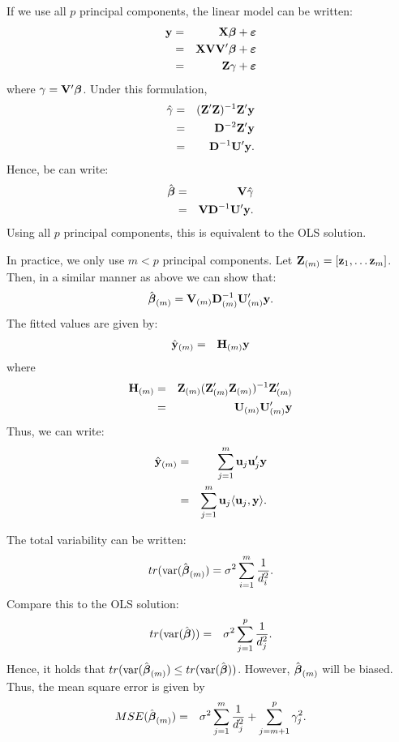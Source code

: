 If we use all $p$ principal components, the linear model can be written:
\begin{eqnarray*}
\mathbf{y} &=& \mathbf{X} \mbox{\boldmath $\beta$} + \mbox{\boldmath $\varepsilon$} \\
&=& \mathbf{X} \mathbf{V} \mathbf{V}' \mbox{\boldmath $\beta$} + \mbox{\boldmath $\varepsilon$} \\
&=& \mathbf{Z} {\bf \gamma} + \mbox{\boldmath $\varepsilon$}
\end{eqnarray*}
where ${\bf \gamma} = \mathbf{V}' \mbox{\boldmath $\beta$}$.
Under this formulation,
\begin{eqnarray*}
\hat {\bf \gamma} &=& (\mathbf{Z}' \mathbf{Z})^{-1} \mathbf{Z}' \mathbf{y} \\
&=& \mathbf{D}^{-2} \mathbf{Z}' \mathbf{y}\\
&=& \mathbf{D}^{-1} \mathbf{U}' \mathbf{y}.
\end{eqnarray*}
Hence, be can write:
\begin{eqnarray*}
\hat {\mbox{\boldmath $\beta$}} &=& \mathbf{V} \hat {\bf \gamma}  \\
&=& \mathbf{V} \mathbf{D}^{-1} \mathbf{U}' \mathbf{y}.
\end{eqnarray*}
Using all $p$ principal components, this is equivalent to the OLS solution.

In practice, we only use $m < p$ principal components.
Let $\mathbf{Z}_{(m)} = [\mathbf{z}_1, \ldots \mathbf{z}_m]$.
Then, in a similar manner as above we can show that:
$$\hat {\mbox{\boldmath $\beta$}}_{(m)} = \mathbf{V}_{(m)} \mathbf{D}_{(m)}^{-1} \mathbf{U}_{(m)}' \mathbf{y}.$$
The fitted values are given by: 
\begin{eqnarray*}
\hat {\mathbf{y}}_{(m)} &=& \mathbf{H}_{(m)} \mathbf{y}
\end{eqnarray*}
where
\begin{eqnarray*}
\mathbf{H}_{(m)} &=& \mathbf{Z}_{(m)} (\mathbf{Z}_{(m)}'\mathbf{Z}_{(m)})^{-1} \mathbf{Z}_{(m)}' \\
&=& \mathbf{U}_{(m)} \mathbf{U}_{(m)}' \mathbf{y}
\end{eqnarray*}
Thus, we can write:
\begin{eqnarray*}
\hat {\mathbf{y}}_{(m)} &=& \sum_{j=1}^m  \mathbf{u}_j \mathbf{u}_j'  \mathbf{y} \\
&=& \sum_{j=1}^m  \mathbf{u}_j \langle \mathbf{u}_j,  \mathbf{y} \rangle.
\end{eqnarray*}

The total variability can be written:
$$
tr(\mathrm{var}(\hat {\mbox{\boldmath $\beta$}}_{(m)}) = \sigma^2 \sum_{i=1}^m \frac{1}{d_i^2}. 
$$
Compare this to the OLS solution:
\begin{eqnarray*}
tr(\mathrm{var}(\hat {\mbox{\boldmath $\beta$}}))  &=& \sigma^2 \sum_{j=1}^p \frac{1}{d_j^2}.
\end{eqnarray*}
Hence, it holds that $tr(\mathrm{var}(\hat {\mbox{\boldmath $\beta$}}_{(m)}) \le tr(\mathrm{var}(\hat {\mbox{\boldmath $\beta$}}))$.
However, $\hat {\mbox{\boldmath $\beta$}}_{(m)}$ will be biased.
Thus, the mean square error is given by
\begin{eqnarray*}
MSE(\hat {\mbox{\boldmath $\beta$}}_{(m)})  &=& \sigma^2 \sum_{j=1}^m \frac{1}{d_j^2} + \sum_{j=m+1}^p \gamma_j^2.
\end{eqnarray*}


